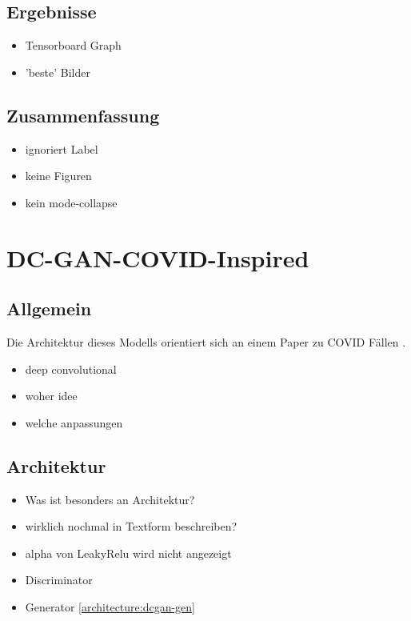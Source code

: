 \subsection{Ergebnisse}
\begin{itemize}
	\item Tensorboard Graph
	\item 'beste' Bilder
\end{itemize}

\subsection{Zusammenfassung}
\begin{itemize}
	\item ignoriert Label
	\item keine Figuren
	\item kein mode-collapse
\end{itemize}

\section{DC-GAN-COVID-Inspired}
\subsection{Allgemein}
Die Architektur dieses Modells orientiert sich an einem Paper zu COVID Fällen \cite{inspiration-dc-gan-2}.


\begin{itemize}
	\item deep convolutional
	\item woher idee \cite{inspiration-dc-gan-2}
	\item welche anpassungen
\end{itemize}

\subsection{Architektur}
\begin{itemize}
	\item Was ist besonders an Architektur?
	\item wirklich nochmal in Textform beschreiben?
	\item alpha von LeakyRelu wird nicht angezeigt
	\item Discriminator 
	\item Generator \cref{architecture:dcgan-gen}
\end{itemize}

